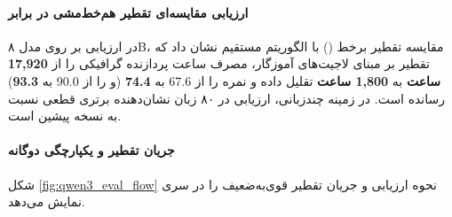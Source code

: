 \begin{table}[htbp]
\centering
\caption{ارزیابی مقایسه‌ای  در حالت پاسخ مستقیم ()}
\label{tab:qwen3_eval_non_thinking}
\end{table}

\paragraph*{ارزیابی مقایسه‌ای تقطیر هم‌خط‌مشی در برابر }
در ارزیابی بر روی مدل ۸B، مقایسه تقطیر برخط () با الگوریتم  مستقیم نشان داد که تقطیر بر مبنای لاجیت‌های آموزگار، مصرف ساعت پردازنده گرافیکی را از \textbf{17,920 ساعت} به \textbf{1,800 ساعت} تقلیل داده و نمره  را از 67.6 به \textbf{74.4} (و  را از 90.0 به \textbf{93.3}) رسانده است. در زمینه چندزبانی، ارزیابی  در ۸۰ زبان نشان‌دهنده برتری قطعی نسبت به نسخه پیشین است.

\paragraph*{جریان تقطیر و یکپارچگی دوگانه}
شکل \ref{fig:qwen3_eval_flow} نحوه ارزیابی و جریان تقطیر قوی‌به‌ضعیف را در سری  نمایش می‌دهد.

